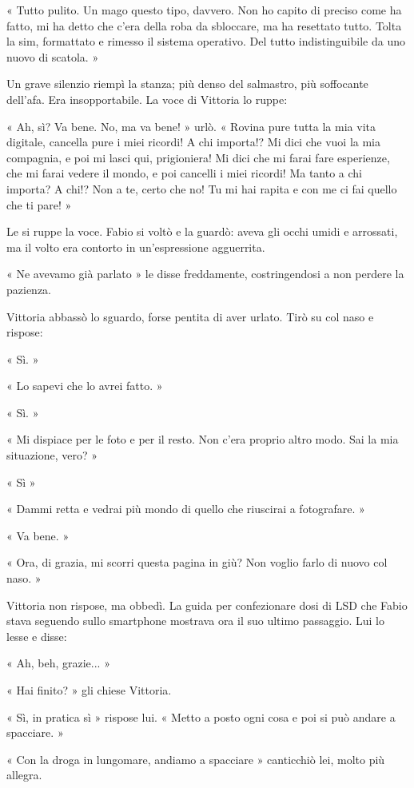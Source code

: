 « Tutto pulito. Un mago questo tipo, davvero. Non ho capito di preciso come ha fatto, mi ha detto che c'era della roba da sbloccare, ma ha resettato tutto. Tolta la sim, formattato e rimesso il sistema operativo. Del tutto indistinguibile da uno nuovo di scatola. »

Un grave silenzio riempì la stanza; più denso del salmastro, più soffocante dell'afa. Era insopportabile. La voce di Vittoria lo ruppe:

« Ah, sì? Va bene. No, ma va bene! » urlò. « Rovina pure tutta la mia vita digitale, cancella pure i miei ricordi! A chi importa!? Mi dici che vuoi la mia compagnia, e poi mi lasci qui, prigioniera! Mi dici che mi farai fare esperienze, che mi farai vedere il mondo, e poi cancelli i miei ricordi! Ma tanto a chi importa? A chi!? Non a te, certo che no! Tu mi hai rapita e con me ci fai quello che ti pare! »

Le si ruppe la voce. Fabio si voltò e la guardò: aveva gli occhi umidi e arrossati, ma il volto era contorto in un'espressione agguerrita.

« Ne avevamo già parlato » le disse freddamente, costringendosi a non perdere la pazienza.

Vittoria abbassò lo sguardo, forse pentita di aver urlato. Tirò su col naso e rispose:

« Sì. »

« Lo sapevi che lo avrei fatto. »

« Sì. »

« Mi dispiace per le foto e per il resto. Non c'era proprio altro modo. Sai la mia situazione, vero? »

« Sì »

« Dammi retta e vedrai più mondo di quello che riuscirai a fotografare. »

« Va bene. »

« Ora, di grazia, mi scorri questa pagina in giù? Non voglio farlo di nuovo col naso. »

Vittoria non rispose, ma obbedì. La guida per confezionare dosi di LSD che Fabio stava seguendo sullo smartphone mostrava ora il suo ultimo passaggio. Lui lo lesse e disse:

« Ah, beh, grazie... »

« Hai finito? » gli chiese Vittoria.

« Sì, in pratica sì » rispose lui. « Metto a posto ogni cosa e poi si può andare a spacciare. »

« Con la droga in lungomare, andiamo a spacciare » canticchiò lei, molto più allegra.

